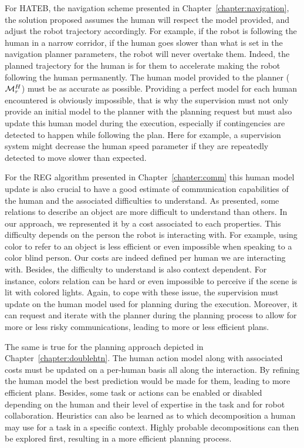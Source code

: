 \documentclass[a4paper,11pt,twoside]{StyleThese}
\begin{document}
For HATEB, the navigation scheme presented in Chapter~\ref{chapter:navigation}, the solution proposed assumes the human will respect the model provided, and adjust the robot trajectory accordingly. For example, if the robot is following the human in a narrow corridor, if the human goes slower than what is set in the navigation planner parameters, the robot will never overtake them. Indeed, the planned trajectory for the human is for them to accelerate making the robot following the human permanently. The human model provided to the planner ($\mathcal{M}^H_r$) must be as accurate as possible. Providing a perfect model for each human encountered is obviously impossible, that is why the supervision must not only provide an initial model to the planner with the planning request but must also update this human model during the execution, especially if contingencies are detected to happen while following the plan. Here for example, a supervision system might decrease the human speed parameter if they are repeatedly detected to move slower than expected.

For the REG algorithm presented in Chapter~\ref{chapter:comm} this human model update is also crucial to have a good estimate of communication capabilities of the human and the associated difficulties to understand. As presented, some relations to describe an object are more difficult to understand than others. In our approach, we represented it by a cost associated to each properties. This difficulty depends on the person the robot is interacting with. For example, using color to refer to an object is less efficient or even impossible when speaking to a color blind person. Our costs are indeed defined per human we are interacting with. Besides, the difficulty to understand is also context dependent. For instance, colors relation can be hard or even impossible to perceive if the scene is lit with colored lights. Again, to cope with these issue, the supervision must update on the human model used for planning during the execution. Moreover, it can request and iterate with the planner during the planning process to allow for more or less risky communications, leading to more or less efficient plans.

The same is true for the planning approach depicted in Chapter~\ref{chapter:doublehtn}. The human action model along with associated costs must be updated on a per-human basis all along the interaction. By refining the human model the best prediction would be made for them, leading to more efficient plans. Besides, some task or actions can be enabled or disabled depending on the human and their level of expertise in the task and for robot collaboration. Heuristics can also be learned as to which decomposition a human may use for a task in a specific context. Highly probable decompositions can then be explored first, resulting in a more efficient planning process.
\end{document}
